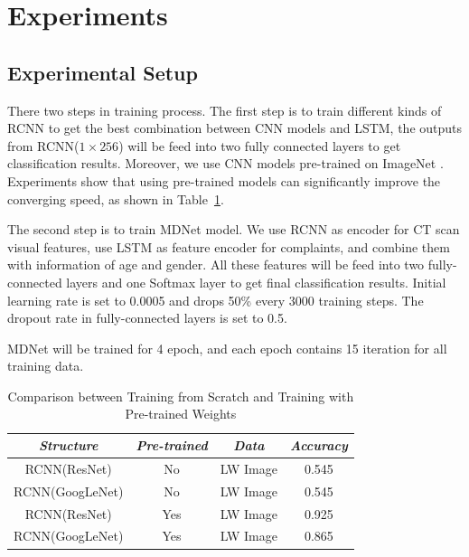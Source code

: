 \documentclass[journal]{IEEEtran}
\begin{document}
\section{Experiments}
\label{experiments}

\subsection{Experimental Setup}
\label{experimentalsetup}
There two steps in training process.
The first step is to train different kinds of RCNN to get the best combination between CNN models and LSTM, the outputs from RCNN($1 \times 256$) will be feed into two fully connected layers to get classification results. Moreover, we use CNN models pre-trained on ImageNet \cite{ILSVRC15}. Experiments show that using pre-trained models can significantly improve the converging speed, as shown in Table~\ref{pretrain}.

The second step is to train MDNet model. We use RCNN as encoder for CT scan visual features, use LSTM as feature encoder for complaints, and combine them with information of age and gender. All these features will be feed into two fully-connected layers and one Softmax layer to get final classification results. Initial learning rate is set to 0.0005 and drops 50\% every 3000 training steps. The dropout rate in fully-connected layers is set to 0.5.

MDNet will be trained for 4 epoch, and each epoch contains 15 iteration for all training data.

\begin{table}[htb]
\vspace{-0cm}
\caption{Comparison between Training from Scratch and Training with Pre-trained Weights}
\vspace{-0cm}
\begin{center}
\begin{tabular}{|c|c|c|c|}
\hline
\textbf{\textit{Structure}} & \textbf{\textit{Pre-trained}} & \textbf{\textit{Data}}& \textbf{\textit{Accuracy}}  \\
\hline
RCNN(ResNet) &No & LW Image & 0.545\\
RCNN(GoogLeNet) & No & LW Image & 0.545\\
RCNN(ResNet) & Yes & LW Image & 0.925\\
RCNN(GoogLeNet) & Yes & LW Image & 0.865\\

\hline
\end{tabular}
\vspace{-0cm}
\label{pretrain}
\end{center}
\vspace{-0cm}
\end{table}
\end{document}
